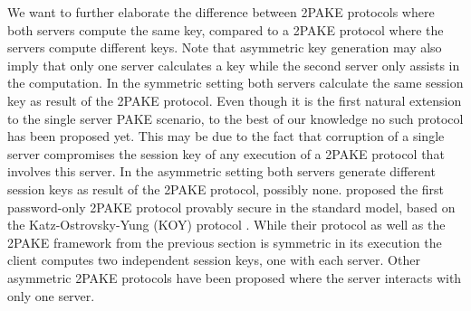 
We want to further elaborate the difference between \ac{2PAKE} protocols where both servers compute the same key, compared to a \ac{2PAKE} protocol where the servers compute different keys.
Note that asymmetric key generation may also imply that only one server calculates a key while the second server only assists in the computation.
In the symmetric setting both servers calculate the same session key as result of the \ac{2PAKE} protocol.
Even though it is the first natural extension to the single server \ac{PAKE} scenario, to the best of our knowledge no such protocol has been proposed yet.
This may be due to the fact that corruption of a single server compromises the session key of any execution of a \ac{2PAKE} protocol that involves this server.
In the asymmetric setting both servers generate different session keys as result of the \ac{2PAKE} protocol, possibly none.
\citet{Katz2012a} proposed the first password-only \ac{2PAKE} protocol provably secure in the standard model, based on the Katz-Ostrovsky-Yung (KOY) protocol \cite{KatzOY01}.
While their protocol as well as the \ac{2PAKE} framework from the previous section is symmetric in its execution the client computes two independent session keys, one with each server.
Other asymmetric \ac{2PAKE} protocols have been proposed \cite{Yang_Deng_Bao_2006,Jin_Wong_Xu_2007} where the server interacts with only one server.

